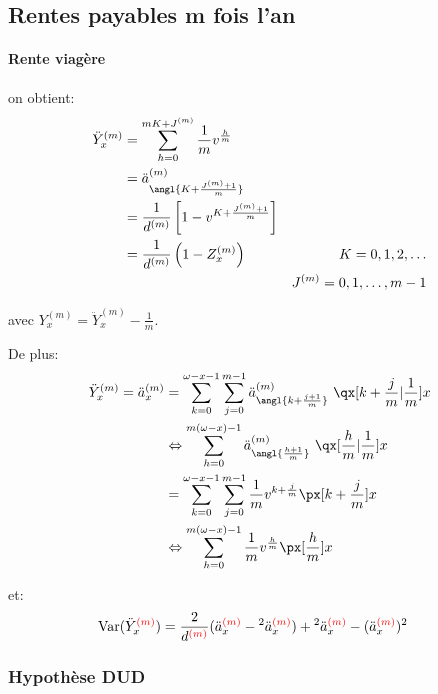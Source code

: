 \documentclass[10pt, french]{article}
\begin{document}
\begin{multicols*}{3}
\columnbreak
\subsection{Rentes payables m fois l'an}
\paragraph{Rente viagère}
on obtient:
\begin{align*}
	\ddot{Y}_{x}^{(m)} 
	&= 	\sum_{h = 0}^{m K + J^{(m)}} \frac{1}{m} v^{\frac{h}{m}}	\\
	&= 	\ddot{a}^{(m)}_{\angl{K + \frac{J^{(m)} + 1}{m}}}	\\
	&=	\frac{1}{d^{(m)}} \left[ 1 - v^{K + \frac{J^{(m)} + 1}{m}} \right]	\\
	&=	\frac{1}{d^{(m)}} \left( 1 - Z_{x}^{(m)} \right)			&K = 0, 1, 2, \dots	\\
	&\	&J^{(m)} = 0, 1, \dots, m - 1
\end{align*}

avec ${Y}_{x}^{(m)} = \ddot{Y}_{x}^{(m)} - \frac{1}{m}$.

De plus:
\begin{align*}
	\ddot{Y}_{x}^{(m)} = \ddot{a}_{x}^{(m)}
	&= 	\sum_{k = 0}^{\omega -x - 1}\sum_{j = 0}^{m - 1} \ddot{a}^{(m)}_{\angl{k + \frac{j + 1}{m}}} \ \qx[k + \frac{j}{m}	| \frac{1}{m}]{x}\\
	&\Leftrightarrow 	\sum_{h = 0}^{m (\omega - x) - 1} \ddot{a}^{(m)}_{\angl{\frac{h + 1}{m}}} \ \qx[\frac{h}{m}	| \frac{1}{m}]{x}\\
	&= 	\sum_{k = 0}^{\omega -x - 1}\sum_{j = 0}^{m - 1} \frac{1}{m} v^{k + \frac{j}{m}} \px[k + \frac{j}{m}]{x}	\\
	&\Leftrightarrow 	\sum_{h = 0}^{m (\omega - x) - 1} \frac{1}{m} v^{\frac{h}{m}} \px[\frac{h}{m}]{x}
\end{align*}

et:
\begin{align*}
	\text{Var}(\ddot{Y}_{x}^{\textcolor{red}{(m)}})
	&=	\frac{2}{d^{\textcolor{red}{(m)}}}
		(\ddot{a}_{x}^{\textcolor{red}{(m)}} - \prescript{2}{}{\ddot{a}}_{x}^{\textcolor{red}{(m)}}) + 
		\prescript{2}{}{\ddot{a}}_{x}^{\textcolor{red}{(m)}} - 
		(\ddot{a}_{x}^{\textcolor{red}{(m)}})^{2}
\end{align*}

\subsubsection*{Hypothèse DUD}


\end{multicols*}
\end{document}
